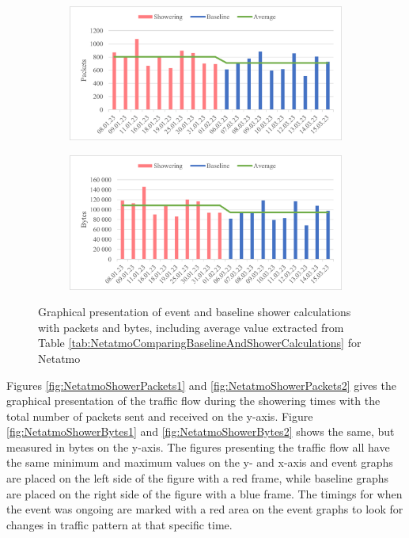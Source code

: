 \begin{figure}[H]
    \centering
    \begin{subfigure}{0.8\textwidth}
       \centering
       \includegraphics[width=1\hsize]{figures/Netatmo_Shower_Calculations_Packets.png} 
    \end{subfigure}
    \begin{subfigure}{0.8\textwidth}
        \centering
        \includegraphics[width=1\hsize]{figures/Netatmo_Shower_Calculations_Bytes.png} 
    \end{subfigure}
    \caption{Graphical presentation of event and baseline shower calculations with packets and bytes, including average value extracted from Table \ref{tab:NetatmoComparingBaselineAndShowerCalculations} for Netatmo}
    \label{fig:NetatmoShowerCalculations}
\end{figure}

Figures \ref{fig:NetatmoShowerPackets1} and \ref{fig:NetatmoShowerPackets2} gives the graphical presentation of the traffic flow during the showering times with the total number of packets sent and received on the y-axis. Figure \ref{fig:NetatmoShowerBytes1} and \ref{fig:NetatmoShowerBytes2} shows the same, but measured in bytes on the y-axis. The figures presenting the traffic flow all have the same minimum and maximum values on the y- and x-axis and event graphs are placed on the left side of the figure with a red frame, while baseline graphs are placed on the right side of the figure with a blue frame. The timings for when the event was ongoing are marked with a red area on the event graphs to look for changes in traffic pattern at that specific time. 

